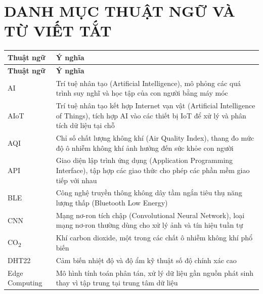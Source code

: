 \chapter*{DANH MỤC THUẬT NGỮ VÀ TỪ VIẾT TẮT}

\begin{longtable}{p{3cm} p{11cm}}
\toprule
\textbf{Thuật ngữ} & \textbf{Ý nghĩa} \\
\midrule
\endfirsthead
\toprule
\textbf{Thuật ngữ} & \textbf{Ý nghĩa} \\
\midrule
\endhead
\bottomrule
\endfoot

AI      & Trí tuệ nhân tạo (Artificial Intelligence), mô phỏng các quá
          trình suy nghĩ và học tập của con người bằng máy móc \\[4pt]

AIoT    & Trí tuệ nhân tạo kết hợp Internet vạn vật (Artificial Intelligence
          of Things), tích hợp AI vào các thiết bị IoT để xử lý và phân
          tích dữ liệu tại chỗ \\[4pt]

AQI     & Chỉ số chất lượng không khí (Air Quality Index), thang đo mức
          độ ô nhiễm không khí ảnh hưởng đến sức khỏe con người \\[4pt]

API     & Giao diện lập trình ứng dụng (Application Programming Interface),
          tập hợp các giao thức cho phép các phần mềm giao tiếp với nhau \\[4pt]

BLE     & Công nghệ truyền thông không dây tầm ngắn tiêu thụ năng lượng
          thấp (Bluetooth Low Energy) \\[4pt]

CNN     & Mạng nơ-ron tích chập (Convolutional Neural Network), loại mạng
          nơ-ron thường dùng cho xử lý ảnh và tín hiệu tuần tự \\[4pt]

CO\textsubscript{2}
        & Khí carbon dioxide, một trong các chất ô nhiễm không khí phổ biến \\[4pt]

DHT22   & Cảm biến nhiệt độ và độ ẩm kỹ thuật số độ chính xác cao \\[4pt]

Edge Computing
        & Mô hình tính toán phân tán, xử lý dữ liệu gần nguồn phát sinh
          thay vì tập trung tại trung tâm dữ liệu \\[4pt]


\end{longtable}
